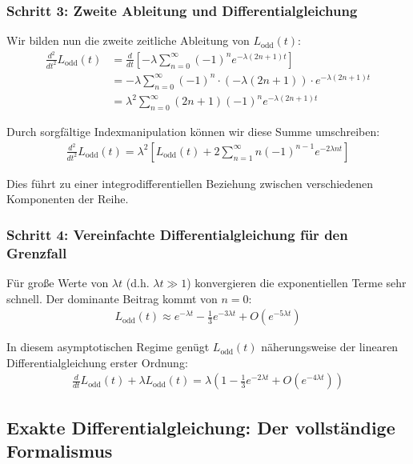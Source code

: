 \documentclass[a4paper,12pt,twoside]{report}
\theoremstyle{definition}
\begin{document}
\subsubsection*{Schritt 3: Zweite Ableitung und Differentialgleichung}

Wir bilden nun die zweite zeitliche Ableitung von $L_{\text{odd}}(t)$:
\begin{align}
	\frac{d^2}{dt^2} L_{\text{odd}}(t) &= \frac{d}{dt} \left[ -\lambda \sum_{n=0}^{\infty} (-1)^n e^{-\lambda(2n+1)t} \right] \\
	&= -\lambda \sum_{n=0}^{\infty} (-1)^n \cdot (-\lambda(2n+1)) \cdot e^{-\lambda(2n+1)t} \\
	&= \lambda^2 \sum_{n=0}^{\infty} (2n+1)(-1)^n e^{-\lambda(2n+1)t}
\end{align}

Durch sorgfältige Indexmanipulation können wir diese Summe umschreiben:
\begin{align}
	\frac{d^2}{dt^2} L_{\text{odd}}(t) = \lambda^2 \left[ L_{\text{odd}}(t) + 2 \sum_{n=1}^{\infty} n(-1)^{n-1} e^{-2\lambda n t} \right]
\end{align}

Dies führt zu einer integrodifferentiellen Beziehung zwischen verschiedenen Komponenten der Reihe.

\subsubsection*{Schritt 4: Vereinfachte Differentialgleichung für den Grenzfall}

Für große Werte von $\lambda t$ (d.h. $\lambda t \gg 1$) konvergieren die exponentiellen Terme sehr schnell. Der dominante Beitrag kommt von $n=0$:
\begin{align}
	L_{\text{odd}}(t) \approx e^{-\lambda t} - \frac{1}{3} e^{-3\lambda t} + O(e^{-5\lambda t})
\end{align}

In diesem asymptotischen Regime genügt $L_{\text{odd}}(t)$ näherungsweise der linearen Differentialgleichung erster Ordnung:
\begin{align}
	\frac{d}{dt} L_{\text{odd}}(t) + \lambda L_{\text{odd}}(t) = \lambda \left( 1 - \frac{1}{3} e^{-2\lambda t} + O(e^{-4\lambda t}) \right)
\end{align}

\subsection{Exakte Differentialgleichung: Der vollständige Formalismus}
\end{document}
